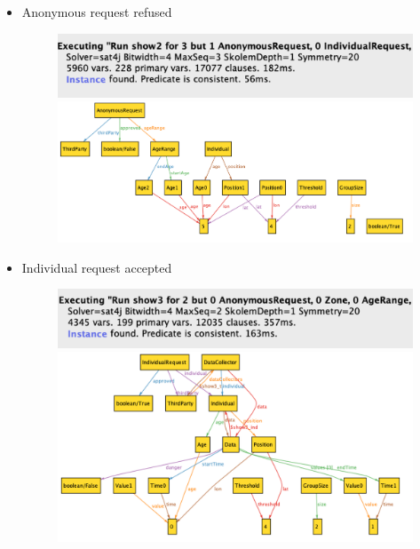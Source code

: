 \documentclass{article}
\begin{document}
\begin{legal}
\begin{itemize}
\begin{figure}[H]
			\end{figure}
			\item Anonymous request refused
			\begin{figure}[H]
		  				\includegraphics[width=\linewidth]{./images/alloy/anonymous-request-false-Run.png}
		  				\includegraphics[width=\linewidth]{./images/alloy/anonymous-request-false-World.png}
			\end{figure}
			\newpage
			\item Individual request accepted
			\begin{figure}[H]
		  				\includegraphics[width=\linewidth]{./images/alloy/individual-request-true-Run.png}
		  				\includegraphics[width=\linewidth]{./images/alloy/individual-request-true-World.png}
			\end{figure}
			\newpage

\end{itemize}
\end{legal}
\end{document}
